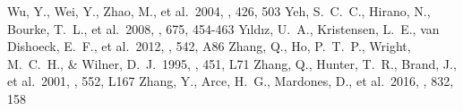 \documentclass[twocolumn]{aastex61}
\begin{document}
\begin{thebibliography}{}
 Wu, Y., Wei, Y., Zhao, M., et al.\ 2004, \aap, 426, 503
 Yeh, S.~C.~C., Hirano, N., Bourke, T.~L., et al.\ 2008, \apj, 675, 454-463
 Y{\i}ld{\i}z, U.~A., Kristensen, L.~E., van Dishoeck, E.~F., et al.\ 2012, \aap, 542, A86
 Zhang, Q., Ho, P.~T.~P., Wright, M.~C.~H., \& Wilner, D.~J.\ 1995, \apjl, 451, L71 
 Zhang, Q., Hunter, T.~R., Brand, J., et al.\ 2001, \apjl, 552, L167 
 Zhang, Y., Arce, H.~G., Mardones, D., et al.\ 2016, \apj, 832, 158
\end{thebibliography}
\end{document}
